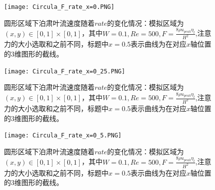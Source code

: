 \documentclass[11pt,UTF8]{ctexart}
\begin{document}
    \begin{figure}[h]
        \centerline{\texttt{[image: Circula\_F\_rate\_x=0.PNG]}}
        \caption{圆形区域下泊肃叶流速度随着$rate$的变化情况：模拟区域为$(x,y)\in [0,1]\times [0,1]$，其中$W=0.1,Re=500,F=\frac{8\rho u_{peak} \eta_l}{H^2}$,注意力的大小选取和之前不同，标题中$x=0.5$表示曲线为在对应$x$轴位置的3维图形的截线。}
        \label{img22}
    \end{figure}
    \begin{figure}[h]
        \centerline{\texttt{[image: Circula\_F\_rate\_x=0\_25.PNG]}}
        \caption{圆形区域下泊肃叶流速度随着$rate$的变化情况：模拟区域为$(x,y)\in [0,1]\times [0,1]$，其中$W=0.1,Re=500,F=\frac{8\rho u_{peak} \eta_l}{H^2}$,注意力的大小选取和之前不同，标题中$x=0.5$表示曲线为在对应$x$轴位置的3维图形的截线。}
        \label{img23}
    \end{figure}
    \begin{figure}[h]
        \centerline{\texttt{[image: Circula\_F\_rate\_x=0\_5.PNG]}}
        \caption{圆形区域下泊肃叶流速度随着$rate$的变化情况：模拟区域为$(x,y)\in [0,1]\times [0,1]$，其中$W=0.1,Re=500,F=\frac{8\rho u_{peak} \eta_l}{H^2}$,注意力的大小选取和之前不同，标题中$x=0.5$表示曲线为在对应$x$轴位置的3维图形的截线。}
        \label{img24}
    \end{figure}
\end{document}
